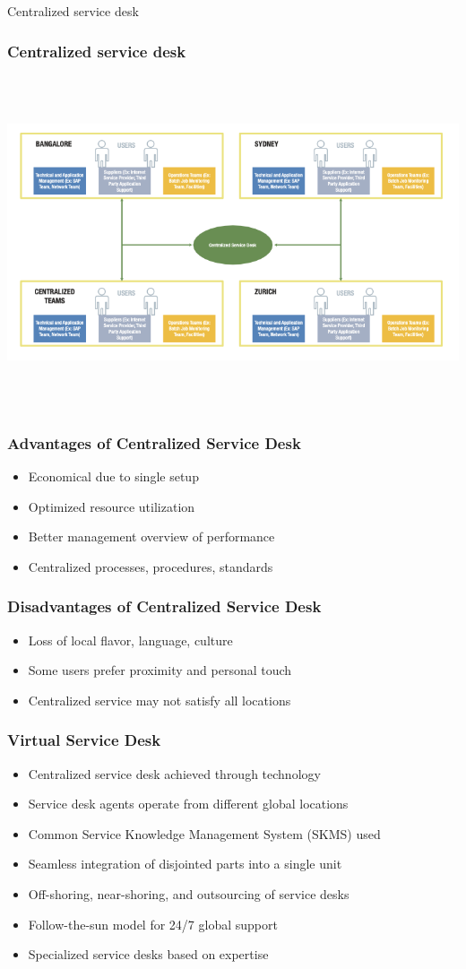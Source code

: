 \documentclass[aspectratio=169, table]{beamer}
\begin{document}
\begin{frame}{Centralized service desk} 	 \frametitle{Centralized service desk} \begin{center} 	\includegraphics[width=0.8\linewidth]{images/image-03.png} \end{center} \end{frame}

\begin{frame}
	\frametitle{Advantages of Centralized Service Desk}
	\begin{itemize}
		\item Economical due to single setup
		\item Optimized resource utilization
		\item Better management overview of performance
		\item Centralized processes, procedures, standards
	\end{itemize}
\end{frame}

\begin{frame}
	\frametitle{Disadvantages of Centralized Service Desk}
	\begin{itemize}
		\item Loss of local flavor, language, culture
		\item Some users prefer proximity and personal touch
		\item Centralized service may not satisfy all locations
	\end{itemize}
\end{frame}

\begin{frame}
	\frametitle{Virtual Service Desk}
	\begin{itemize}
		\item Centralized service desk achieved through technology
		\item Service desk agents operate from different global locations
		\item Common Service Knowledge Management System (SKMS) used
		\item Seamless integration of disjointed parts into a single unit
		\item Off-shoring, near-shoring, and outsourcing of service desks
		\item Follow-the-sun model for 24/7 global support
		\item Specialized service desks based on expertise
	\end{itemize}
\end{frame}
\end{document}
